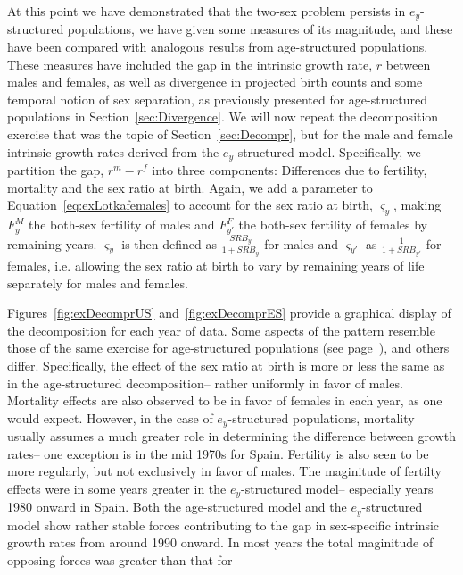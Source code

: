 At this point we have demonstrated that the two-sex problem persists in
$e_y$-structured populations, we have given some measures of its
magnitude, and these have been compared with analogous results from
age-structured populations. These measures have included the gap in the
intrinsic growth rate, $r$ between males and females, as well as
divergence in projected birth counts and some
temporal notion of sex separation, as previously
presented for age-structured populations in Section~\ref{sec:Divergence}. We
will now repeat the decomposition exercise that was the topic of
 Section~\ref{sec:Decompr}, but for the male and female intrinsic growth rates 
 derived from the $e_y$-structured model. Specifically, we partition the 
 gap, $r^m-r^f$ into three components: Differences due to fertility, 
 mortality and the sex
ratio at birth. Again, we add a parameter to Equation~\eqref{eq:exLotkafemales}
to account for the sex ratio at birth, $\varsigma _{y}$, making $F_{y}^M$
the both-sex fertility of males and $F_{y'}^F$ the both-sex fertility of females
by remaining years. $\varsigma _{y}$ is then defined as $\frac{SRB_y}{1+SRB_y}$
for males and $\varsigma _{y'}$ as $\frac{1}{1+SRB_{y'}}$ for females, i.e.
allowing the sex ratio at birth to vary by remaining years of life separately 
for males and females.

Figures~\ref{fig:exDecomprUS} and~\ref{fig:exDecomprES} provide a graphical
display of the decomposition for each year of data. Some
aspects of the pattern resemble those of the same exercise for age-structured 
populations (see page~\pageref{fig:DecomprUS}), and others differ.
Specifically, the effect of the sex ratio at birth is more or less the same as
in the age-structured decomposition-- rather uniformly in favor of males.
Mortality effects are also observed to be in favor of females in each year, as
one would expect. However, in the case of $e_y$-structured populations,
mortality usually assumes a much greater role in determining the difference between growth
rates-- one exception is in the mid 1970s for Spain. Fertility is also seen to
be more regularly, but not exclusively in favor of males. The maginitude of
fertilty effects were in some years greater in the $e_y$-structured model--
especially years 1980 onward in Spain. Both the age-structured model and the
$e_y$-structured model show rather stable forces contributing to the gap in
sex-specific intrinsic growth rates from around 1990 onward. In most years the
total maginitude of opposing forces was greater than that for

